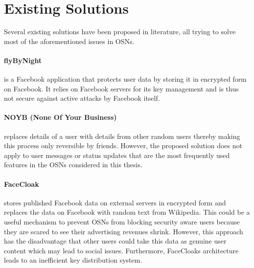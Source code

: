 
\section{Existing Solutions}
\label{sec:existing_solutions}
Several existing solutions have been proposed in literature, all trying to solve most of the aforementioned issues in OSNs.

\paragraph{flyByNight~\cite{art:LucasB09}} is a Facebook application that protects user data by storing it in encrypted form on Facebook. It relies on Facebook servers for its key management and is thus not secure against active attacks by Facebook itself.

\paragraph{NOYB (None Of Your Business)~\cite{art:GuhaSTF08}} replaces details of a user with details from other random users thereby making this process only reversible by friends. However, the proposed solution does not apply to user messages or status updates that are the most frequently used features in the OSNs considered in this thesis.

\paragraph{FaceCloak~\cite{art:LuoXH09}} stores published Facebook data on external servers in encrypted form and replaces the data on Facebook with random text from Wikipedia. This could be a useful mechanism to prevent OSNs from blocking security aware users because they are scared to see their advertising revenues shrink. However, this approach has the disadvantage that other users could take this data as genuine user content which may lead to social issues. Furthermore, FaceCloaks architecture leads to an inefficient key distribution system.

